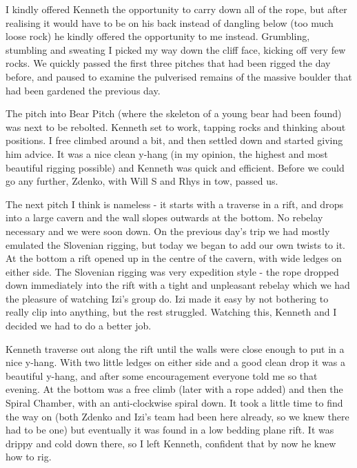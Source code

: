 I kindly offered Kenneth the opportunity to carry down all of the rope, but after realising it would have to be on his back instead of dangling below (too much loose rock) he kindly offered the opportunity to me instead. Grumbling, stumbling and sweating I picked my way down the cliff face, kicking off very few rocks. We quickly passed the first three pitches that had been rigged the day before, and paused to examine the pulverised remains of the massive boulder that had been gardened the previous day.

The pitch into Bear Pitch (where the skeleton of a young bear had been found) was next to be rebolted. Kenneth set to work, tapping rocks and thinking about positions. I free climbed around a bit, and then settled down and started giving him advice. It was a nice clean y-hang (in my opinion, the highest and most beautiful rigging possible) and Kenneth was quick and efficient. Before we could go any further, Zdenko, with Will S and Rhys in tow, passed us.

The next pitch I think is nameless - it starts with a traverse in a rift, and drops into a large cavern and the wall slopes outwards at the bottom. No rebelay necessary and we were soon down. On the previous day’s trip we had mostly emulated the Slovenian rigging, but today we began to add our own twists to it. At the bottom a rift opened up in the centre of the cavern, with wide ledges on either side. The Slovenian rigging was very expedition style - the rope dropped down immediately into the rift with a tight and unpleasant rebelay which we had the pleasure of watching Izi’s group do. Izi made it easy by not bothering to really clip into anything, but the rest struggled. Watching this, Kenneth and I decided we had to do a better job.

Kenneth traverse out along the rift until the walls were close enough to put in a nice y-hang. With two little ledges on either side and a good clean drop it was a beautiful y-hang, and after some encouragement everyone told me so that evening. At the bottom was a free climb (later with a rope added) and then the Spiral Chamber, with an anti-clockwise spiral down. It took a little time to find the way on (both Zdenko and Izi’s team had been here already, so we knew there had to be one) but eventually it was found in a low bedding plane rift. It was drippy and cold down there, so I left Kenneth, confident that by now he knew how to rig.

